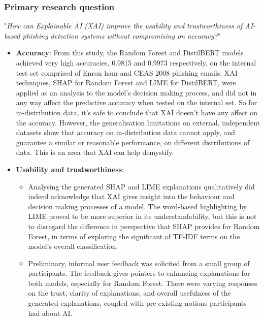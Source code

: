 
\subsubsection*{Primary research question}
"\textit{How can Explainable AI (XAI) improve the usability and trustworthiness of AI-based phishing detection systems without compromising on accuracy?}"

\begin{itemize}
  \item \textbf{Accuracy}: From this study, the Random Forest and DistilBERT models achieved very high accuracies, 0.9815 and 0.9973 respectively, on the internal test set comprised of Enron ham and CEAS 2008 phishing emails. XAI techniques, SHAP for Random Forest and LIME for DistilBERT, were applied as an analysis to the model's decision making process, and did not in any way affect the predictive accuracy when tested on the internal set. So for in-distribution data, it's safe to conclude that XAI doesn't have any affect on the accuracy. However, the generalisation limitations on external, independent datasets show that accuracy on in-distribution data cannot apply, and guarantee a similar or reasonable performance, on different distributions of data. This is an area that XAI can help demystify.
  \item \textbf{Usability and trustworthiness}:
  \begin{itemize}
    \item Analysing the generated SHAP and LIME explanations qualitatively did indeed acknowledge that XAI gives insight into the behaviour and decision making processes of a model. The word-based highlighting by LIME proved to be more superior in its understandability, but this is not to disregard the difference in perspective that SHAP provides for Random Forest, in terms of exploring the significant of TF-IDF terms on the model's overall classification.
    \item Preliminary, informal user feedback was solicited from a small group of participants. The feedback gives pointers to enhancing explanations for both models, especially for Random Forest. There were varying responses on the trust, clarity of explanations, and overall usefulness of the generated explanations, coupled with pre-existing notions participants had about AI.
  \end{itemize}
\end{itemize}
